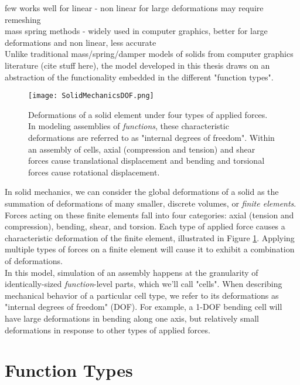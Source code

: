{few works well for linear - non linear for large deformations may require remeshing\\
mass spring methods - widely used in computer graphics, better for large deformations and non linear, less accurate\\

Unlike traditional mass/spring/damper models of solids from computer graphics literature (cite stuff here), the model developed in this thesis draws on an abstraction of the functionality embedded in the different "function types".\\

\begin{figure}
  \texttt{[image: SolidMechanicsDOF.png]}
  \caption{Deformations of a solid element under four types of applied forces.  In modeling assemblies of \textit{functions}, these characteristic deformations are referred to as "internal degrees of freedom".  Within an assembly of cells, axial (compression and tension) and shear forces cause translational displacement and bending and torsional forces cause rotational displacement.}
  \label{fig:SolidMechanicsDOF}
\end{figure}

In solid mechanics, we can consider the global deformations of a solid as the summation of deformations of many smaller, discrete volumes, or \textit{finite elements}.  Forces acting on these finite elements fall into four categories: axial (tension and compression), bending, shear, and torsion.  Each type of applied force causes a characteristic deformation of the finite element, illustrated in Figure \ref{fig:SolidMechanicsDOF}.  Applying multiple types of forces on a finite element will cause it to exhibit a combination of deformations.\\

In this model, simulation of an assembly happens at the granularity of identically-sized \textit{function}-level parts, which we'll call "cells".  When describing mechanical behavior of a particular cell type, we refer to its deformations as "internal degrees of freedom" (DOF).  For example, a 1-DOF bending cell will have large deformations in bending along one axis, but relatively small deformations in response to other types of applied forces.\\

\section{Function Types}

}
